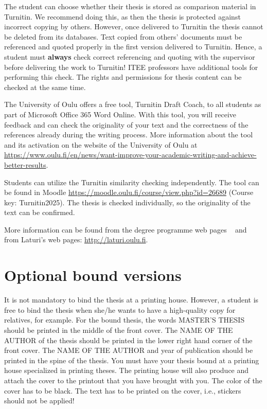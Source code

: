 The student can choose whether their thesis is stored as comparison material
in Turnitin. We recommend doing this, as then
the thesis is protected against incorrect copying by others. However,
once delivered to Turnitin the thesis cannot be deleted from its
databases. Text copied from others’ documents must be referenced
and quoted properly in the first version delivered to Turnitin.
Hence, a student must \textbf{always} check correct referencing and
quoting with the supervisor before delivering the work to Turnitin!
ITEE professors have additional tools for performing this check. The
rights and permissions for thesis content can be checked at the same time.

The University of Oulu offers a free tool, Turnitin Draft Coach, to
all students as part of Microsoft Office 365 Word Online. With this
tool, you will receive feedback and can check the originality of your
text and the correctness of the references already during the writing
process.  More information about the tool and its activation on the
website of the University of Oulu at
\url{https://www.oulu.fi/en/news/want-improve-your-academic-writing-and-achieve-better-results}.

Students can utilize the Turnitin similarity checking independently.
The tool can be found in Moodle
\url{https://moodle.oulu.fi/course/view.php?id=26689} (Course key:
Turnitin2025). The thesis is checked individually, so the originality
of the text can be confirmed.

More information can be found from the degree programme web pages
~\cite{mscstudies} and from Laturi’s web pages: \url{http://laturi.oulu.fi}.

\section{Optional bound versions}

It is not mandatory to bind the thesis at a printing house. However,
a student is free to bind the thesis when she/he wants to have a
high-quality copy for relatives, for example. For the bound thesis,
the words MASTER’S THESIS should be printed in the middle of the
front cover. The NAME OF THE AUTHOR of the thesis should be printed
in the lower right hand corner of the front cover. The NAME OF THE
AUTHOR and year of publication should be printed in the spine of the
thesis. You must have your thesis bound at a printing house
specialized in printing theses. The printing house will also produce
and attach the cover to the printout that you have brought with you.
The color of the cover has to be black. The text has to be printed on
the cover, i.e., stickers should not be applied!

